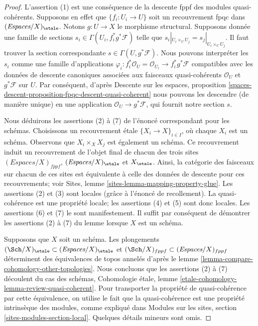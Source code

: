 \begin{proof}
L'assertion (1) est une conséquence de la descente fppf des modules
quasi-cohérents. Supposons en effet que $\{f_i : U_i \to U\}$ soit un
recouvrement fpqc dans $(\textit{Espaces}/X)_\etale$. Notons $g : U \to X$ le
morphisme structural. Supposons donnée une famille de sections
$s_i \in \Gamma(U_i , f_i^*g^*\mathcal{F})$ telle que
$s_i|_{U_i \times_U U_j} = s_j|_{U_i \times_U U_j}$. Il faut trouver la section
correspondante $s \in \Gamma(U, g^*\mathcal{F})$. Nous pouvons interpréter
les $s_i$ comme une famille d'applications
$\varphi_i : f_i^*\mathcal{O}_U = \mathcal{O}_{U_i} \to f_i^*g^*\mathcal{F}$
compatibles avec les données de descente canoniques associées aux faisceaux
quasi-cohérents $\mathcal{O}_U$ et $g^*\mathcal{F}$ sur $U$.
Par conséquent, d'après Descente sur les espaces, proposition
\ref{spaces-descent-proposition-fpqc-descent-quasi-coherent}
nous pouvons les descendre (de manière unique) en une application
$\mathcal{O}_U \to g^*\mathcal{F}$, qui fournit notre section $s$.

\medskip\noindent
Nous déduirons les assertions (2) à (7) de l'énoncé correspondant pour les
schémas. Choisissons un recouvrement étale $\{X_i \to X\}_{i \in I}$, où
chaque $X_i$ est un schéma. Observons que $X_i \times_X X_j$ est également un
schéma. Ce recouvrement induit un recouvrement de l'objet final de chacun des
trois sites
$(\textit{Espaces}/X)_{fppf}$, $(\textit{Espaces}/X)_\etale$ et $X_\etale$.
Ainsi, la catégorie des faisceaux sur chacun de ces sites est équivalente à
celle des données de descente pour ces recouvrements; voir Sites, lemme
\ref{sites-lemma-mapping-property-glue}. Les assertions (2) et (3) sont locales
(grâce à l'énoncé de recollement). La quasi-cohérence est une propriété locale;
les assertions (4) et (5) sont donc locales. Les assertions (6) et (7) le sont
manifestement. Il suffit par conséquent de démontrer les assertions (2) à (7)
du lemme lorsque $X$ est un schéma.

\medskip\noindent
Supposons que $X$ soit un schéma. Les plongements
$(\Sch/X)_\etale \subset (\textit{Espaces}/X)_\etale$ et
$(\Sch/X)_{fppf} \subset (\textit{Espaces}/X)_{fppf}$
déterminent des équivalences de topos annelés d'après le lemme
\ref{lemma-compare-cohomology-other-topologies}.
Nous concluons que les assertions (2) à (7) découlent du cas des schémas,
Cohomologie étale, lemme
\ref{etale-cohomology-lemma-review-quasi-coherent}.
Pour transporter la propriété de quasi-cohérence par cette équivalence, on
utilise le fait que la quasi-cohérence est une propriété intrinsèque des
modules, comme expliqué dans Modules sur les sites, section
\ref{sites-modules-section-local}. Quelques détails mineurs sont omis.
\end{proof}

